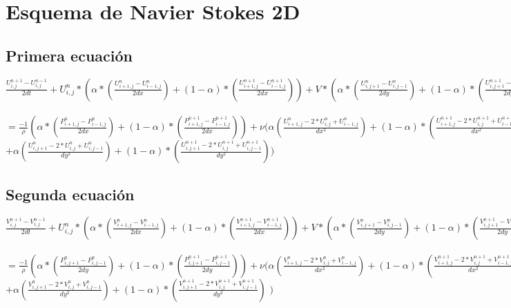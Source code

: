 \documentclass[a4paper]{article}
\begin{document}
\newpage
\section{Esquema de Navier Stokes 2D}
\subsection{Primera ecuación}
$\frac{U^{n+1}_{i,j} - U^{n-1}_{i,j}}{2dt} + U^{n}_{i,j}*(\alpha * (\frac{U^{n}_{i+1,j} - U^{n}_{i-1,j}}{2dx}) + (1-\alpha) * (\frac{U^{n+1}_{i+1,j} - U^{n+1}_{i-1,j}}{2dx})) + V*(\alpha * (\frac{U^{n}_{i,j+1} - U^{n}_{i,j-1}}{2dy}) + (1-\alpha) * (\frac{U^{n+1}_{i,j+1} - U^{n+1}_{i,j-1}}{2dy}))$
\\
\\
$= \frac{-1}{\rho}(\alpha * (\frac{P^{n}_{i+1,j} - P^{n}_{i-1,j}}{2dx}) + (1-\alpha) * (\frac{P^{n+1}_{i+1,j} - P^{n+1}_{i-1,j}}{2dx})) + \nu (\alpha (\frac{ U^{n}_{i+1,j} - 2*U^{n}_{i,j} + U^{n}_{i-1,j}}{dx^2}) + (1-\alpha)*(\frac{ U^{n+1}_{i+1,j} - 2*U^{n+1}_{i,j} + U^{n+1}_{i-1,j}}{dx^2})$
\\
$+ \alpha (\frac{ U^{n}_{i,j+1} - 2*U^{n}_{i,j} + U^{n}_{i,j-1}}{dy^2}) + (1-\alpha)*(\frac{ U^{n+1}_{i,j+1} - 2*U^{n+1}_{i,j} + U^{n+1}_{i,j-1}}{dy^2}))$

\subsection{Segunda ecuación}
$\frac{V^{n+1}_{i,j} - V^{n-1}_{i,j}}{2dt} + U^{n}_{i,j}*(\alpha * (\frac{V^{n}_{i+1,j} - V^{n}_{i-1,j}}{2dx}) + (1-\alpha) * (\frac{V^{n+1}_{i+1,j} - V^{n+1}_{i-1,j}}{2dx})) + V*(\alpha * (\frac{V^{n}_{i,j+1} - V^{n}_{i,j-1}}{2dy}) + (1-\alpha) * (\frac{V^{n+1}_{i,j+1} - V^{n+1}_{i,j-1}}{2dy}))$
\\
\\
$ =\frac{-1}{\rho} (\alpha * (\frac{P^{n}_{i,j+1} - P^{n}_{i,j-1}}{2dy}) + (1-\alpha) * (\frac{P^{n+1}_{i,j+1} - P^{n+1}_{i,j-1}}{2dy})) + \nu (\alpha (\frac{ V^{n}_{i+1,j} - 2*V^{n}_{i,j} + V^{n}_{i-1,j}}{dx^2}) + (1-\alpha)*(\frac{V^{n+1}_{i+1,j} - 2*V^{n+1}_{i,j} + V^{n+1}_{i-1,j}}{dx^2})$
\\
$ + \alpha (\frac{ V^{n}_{i,j+1} - 2*V^{n}_{i,j} + V^{n}_{i,j-1}}{dy^2}) + (1-\alpha)*(\frac{ V^{n+1}_{i,j+1} - 2*V^{n+1}_{i,j} + V^{n+1}_{i,j-1}}{dy^2})$
$)$
\end{document}
